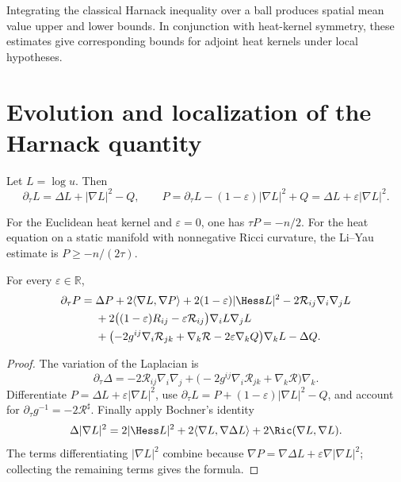 \begin{remark}
\label{rem:chow-iii-harnack-mean-value-adjoint-kernels}
Integrating the classical Harnack inequality over a ball produces spatial
mean value upper and lower bounds.  In conjunction with heat-kernel symmetry,
these estimates give corresponding bounds for adjoint heat kernels under
local hypotheses.
\end{remark}

\section{Evolution and localization of the Harnack quantity}

Let \(L=\log u\).  Then
\[
 \partial_\tau L=\Delta L+|\nabla L|^2-Q,
 \qquad P=\partial_\tau L-(1-\varepsilon)|\nabla L|^2+Q
 =\Delta L+\varepsilon|\nabla L|^2.
\]

\begin{remark}
\label{rem:chow-iii-model-harnack-quantity}
For the Euclidean heat kernel and \(\varepsilon=0\), one has
\(\tau P=-n/2\).  For the heat equation on a static manifold with
nonnegative Ricci curvature, the Li--Yau estimate is \(P\geq-n/(2\tau)\).
\end{remark}

\begin{lemma}
\label{lem:chow-iii-harnack-quantity-evolution}
For every \(\varepsilon\in\mathbb R\),
\[
\begin{aligned}
 \partial_\tau P={}&\Delta P+2\langle\nabla L,\nabla P\rangle
 +2(1-\varepsilon)|\Hess L|^2-2\mathcal R_{ij}\nabla_i\nabla_jL\\
 &+2\bigl((1-\varepsilon)R_{ij}-\varepsilon\mathcal R_{ij}\bigr)
   \nabla_iL\nabla_jL\\
 &+\bigl(-2g^{ij}\nabla_i\mathcal R_{jk}+\nabla_k\mathcal R
          -2\varepsilon\nabla_kQ\bigr)\nabla_kL-\Delta Q.
\end{aligned}
\]
\end{lemma}
\begin{proof}
\sketch The variation of the Laplacian is
\[
 \partial_\tau\Delta=-2\mathcal R_{ij}\nabla_i\nabla_j
 +\bigl(-2g^{ij}\nabla_i\mathcal R_{jk}+\nabla_k\mathcal R\bigr)\nabla_k.
\]
Differentiate \(P=\Delta L+\varepsilon|\nabla L|^2\), use
\(\partial_\tau L=P+(1-\varepsilon)|\nabla L|^2-Q\), and account for
\(\partial_\tau g^{-1}=-2\mathcal R^{\sharp}\).  Finally apply Bochner's
identity
\[
 \Delta|\nabla L|^2=2|\Hess L|^2
 +2\langle\nabla L,\nabla\Delta L\rangle
 +2\Ric(\nabla L,\nabla L).
\]
The terms differentiating \(|\nabla L|^2\) combine because
\(\nabla P=\nabla\Delta L+\varepsilon\nabla|\nabla L|^2\); collecting the
remaining terms gives the formula.
\end{proof}

